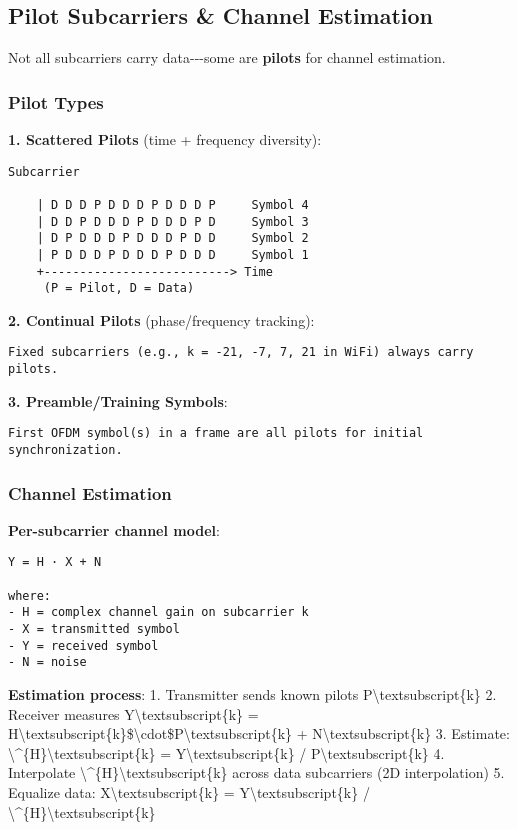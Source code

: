 \subsection{\texorpdfstring{ Pilot Subcarriers \& Channel
Estimation}{ Pilot Subcarriers \& Channel Estimation}}\label{pilot-subcarriers-channel-estimation}

Not all subcarriers carry data-\/-\/-some are \textbf{pilots} for
channel estimation.

\subsubsection{Pilot Types}\label{pilot-types}

\textbf{1. Scattered Pilots} (time + frequency diversity):

\begin{verbatim}
Subcarrier
    
    | D D D P D D D P D D D P     Symbol 4
    | D D P D D D P D D D P D     Symbol 3
    | D P D D D P D D D P D D     Symbol 2
    | P D D D P D D D P D D D     Symbol 1
    +--------------------------> Time
     (P = Pilot, D = Data)
\end{verbatim}

\textbf{2. Continual Pilots} (phase/frequency tracking):

\begin{verbatim}
Fixed subcarriers (e.g., k = -21, -7, 7, 21 in WiFi) always carry pilots.
\end{verbatim}

\textbf{3. Preamble/Training Symbols}:

\begin{verbatim}
First OFDM symbol(s) in a frame are all pilots for initial synchronization.
\end{verbatim}

\subsubsection{Channel Estimation}\label{channel-estimation}

\textbf{Per-subcarrier channel model}:

\begin{verbatim}
Y = H · X + N

where:
- H = complex channel gain on subcarrier k
- X = transmitted symbol
- Y = received symbol
- N = noise
\end{verbatim}

\textbf{Estimation process}: 1. Transmitter sends known pilots
P\textbackslash textsubscript\{k\} 2. Receiver measures
Y\textbackslash textsubscript\{k\} =
H\textbackslash textsubscript\{k\}\$\textbackslash cdot\$P\textbackslash textsubscript\{k\}
+ N\textbackslash textsubscript\{k\} 3. Estimate:
\textbackslash\^{}\{H\}\textbackslash textsubscript\{k\} =
Y\textbackslash textsubscript\{k\} / P\textbackslash textsubscript\{k\}
4. Interpolate \textbackslash\^{}\{H\}\textbackslash textsubscript\{k\}
across data subcarriers (2D interpolation) 5. Equalize data:
X\textbackslash textsubscript\{k\} = Y\textbackslash textsubscript\{k\}
/ \textbackslash\^{}\{H\}\textbackslash textsubscript\{k\}

